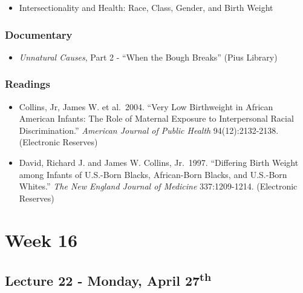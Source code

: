 \documentclass[]{book}
\providecommand{\tightlist}{%
  \setlength{\itemsep}{0pt}\setlength{\parskip}{0pt}}
\begin{document}
\begin{itemize}
\tightlist
\item
  Intersectionality and Health: Race, Class, Gender, and Birth Weight
\end{itemize}

\hypertarget{documentary-3}{%
\subsubsection*{Documentary}\label{documentary-3}}

\begin{itemize}
\tightlist
\item
  \emph{Unnatural Causes}, Part 2 - ``When the Bough Breaks'' (Pius Library)
\end{itemize}

\hypertarget{readings-25}{%
\subsubsection*{Readings}\label{readings-25}}

\begin{itemize}
\tightlist
\item
  Collins, Jr, James W. et al.~2004. ``Very Low Birthweight in African American Infants: The Role of Maternal Exposure to Interpersonal Racial Discrimination.'' \emph{American Journal of Public Health} 94(12):2132-2138. (Electronic Reserves)
\item
  David, Richard J. and James W. Collins, Jr.~1997. ``Differing Birth Weight among Infants of U.S.-Born Blacks, African-Born Blacks, and U.S.-Born Whites.'' \emph{The New England Journal of Medicine} 337:1209-1214. (Electronic Reserves)
\end{itemize}

\newpage

\hypertarget{week-16}{%
\section*{Week 16}\label{week-16}}

\hypertarget{lecture-22---monday-april-27th}{%
\subsection*{\texorpdfstring{Lecture 22 - Monday, April 27\textsuperscript{th}}{Lecture 22 - Monday, April 27th}}\label{lecture-22---monday-april-27th}}
\end{document}

